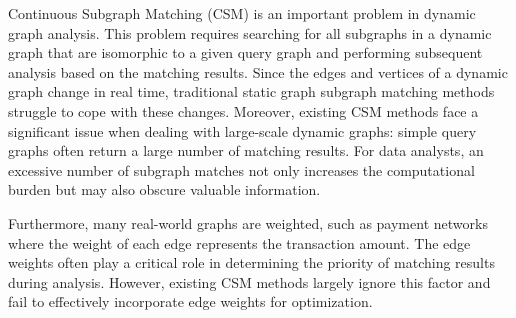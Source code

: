 \begin{enabstract}
	Continuous Subgraph Matching (CSM) is an important problem in dynamic graph analysis. 
	This problem requires searching for all subgraphs in a dynamic graph that are isomorphic to a given query graph and performing subsequent analysis based on the matching results. 
	Since the edges and vertices of a dynamic graph change in real time, traditional static graph subgraph matching methods struggle to cope with these changes. 
	Moreover, existing CSM methods face a significant issue when dealing with large-scale dynamic graphs: simple query graphs often return a large number of matching results. 
	For data analysts, an excessive number of subgraph matches not only increases the computational burden but may also obscure valuable information.

	Furthermore, many real-world graphs are weighted, such as payment networks where the weight of each edge represents the transaction amount. 
	The edge weights often play a critical role in determining the priority of matching results during analysis. 
	However, existing CSM methods largely ignore this factor and fail to effectively incorporate edge weights for optimization.
	

\end{enabstract}
